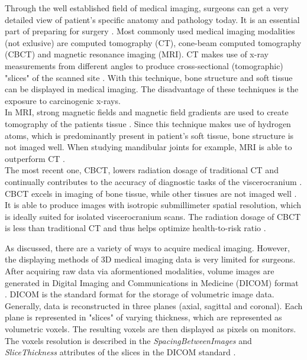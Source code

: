 Through the well established field of medical imaging, surgeons can get a very detailed view of patient’s specific anatomy and pathology today. 
It is an essential part of preparing for surgery \cite{Steinbacher.2015}.
Most commonly used medical imaging modalities (not exlusive) are computed tomography (CT), cone-beam computed tomography (CBCT) and magnetic resonance imaging (MRI).
CT makes use of x-ray measurements from different angles to produce cross-sectional (tomographic) "slices" of the scanned site \cite{Handels.2009}.
With this technique, bone structure and soft tissue can be displayed in medical imaging.
The disadvantage of these techniques is the exposure to carcinogenic x-rays.
\\
In MRI, strong magnetic fields and magnetic field gradients are used to create tomography of the patients tissue \cite{Handels.2009}.
Since this technique makes use of hydrogen atoms, which is predominantly present in patient's soft tissue, bone structure is not imaged well.
When studying mandibular joints for example, MRI is able to outperform CT \cite{RN65}.
\\
The most recent one, CBCT, lowers radiation dosage of traditional CT and continually contributes to the accuracy of diagnostic tasks of the viscerocranium \cite{Vos.2009}.
CBCT excels in imaging of bone tissue, while other tissues are not imaged well \cite{Vos.2009}.
It is able to produce images with isotropic submillimeter spatial resolution, which is ideally suited for isolated viscerocranium scans. 
The radiation dosage of CBCT is less than traditional CT and thus helps optimize health-to-risk ratio \cite{WHITE2008689}.

As discussed, there are a variety of ways to acquire medical imaging.
However, the displaying methods of 3D medical imaging data is very limited for surgeons.
After acquiring raw data via aformentioned modalities, volume images are generated in Digital Imaging and Communications in Medicine (DICOM) format \cite{DICOMStandard}.
DICOM is the standard format for the storage of volumetric image data.
Generally, data is reconstructed in three planes (axial, sagittal and coronal).
Each plane is represented in "slices" of varying thickness, which are represented as volumetric voxels.
The resulting voxels are then displayed as pixels on monitors.
The voxels resolution is described in the \textit{SpacingBetweenImages} and \textit{SliceThickness} attributes of the slices in the DICOM standard \cite{DICOMStandard}.


